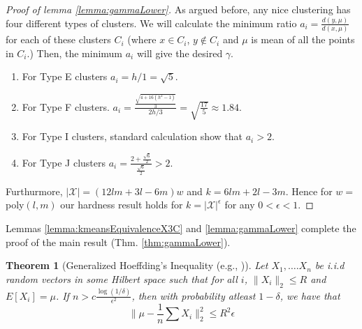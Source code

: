 \documentclass[letterpaper,12pt,titlepage,oneside,final]{book}
\newtheorem{lemma}{Lemma}
\newtheorem{theorem}{Theorem}
\newcommand{\mc}{\mathcal}
\begin{document}
\begin{proof}[Proof of lemma \ref{lemma:gammaLower}]
As argued before, any nice clustering has four different types of clusters. We will calculate the minimum ratio $a_i = \frac{d(y, \mu)}{d(x, \mu)}$ for each of these clusters $C_i$ (where $x \in C_i$, $y \not\in C_i$ and $\mu$ is mean of all the points in $C_i$.) Then, the minimum $a_i$ will give the desired $\gamma$. 
\begin{enumerate}[label=(\arabic*),nolistsep,leftmargin=*]
\item For Type E clusters $a_i = h/1 = \sqrt{5}$. 
\item For Type F clusters. $a_i = \frac{\frac{\sqrt{4+16(h^2-1)}}{3}}{2h/3} = \sqrt{\frac{17}{5}} \approx 1.84$. 
\item For Type I clusters, standard calculation show that $a_i > 2$.
\item For Type J clusters $a_i = \frac{2+\frac{\sqrt{6}}{2}}{\frac{\sqrt{6}}{2}} > 2$.
\end{enumerate}

\noindent Furthurmore, $|\mc X| = (12lm + 3l -6m)w$ and $k = 6lm + 2l - 3m$. Hence for $w = $poly$(l, m)$ our hardness result holds for $k = |\mc X|^{\epsilon}$ for any $0 < \epsilon < 1$.
\end{proof}
\noindent Lemmas \ref{lemma:kmeansEquivalenceX3C} and \ref{lemma:gammaLower} complete the proof of the main result (Thm. \ref{thm:gammaLower}). 



\begin{theorem}[Generalized Hoeffding's Inequality (e.g., \cite{ashtiani2015dimension})]
\label{thm:genHoeff}
Let $X_1, \ldots. X_n$ be i.i.d random vectors in some Hilbert space such that for all $i$, $\|X_i\|_2 \le R$ and $E[X_i] = \mu$. If $n > c\frac{\log(1/\delta)}{\epsilon^2}$, then with probability atleast $1-\delta$, we have that
$$\Big\|\mu - \frac{1}{n}\sum X_i\Big\|_2^2 \le R^2\epsilon$$ 
\end{theorem}

\end{document}
